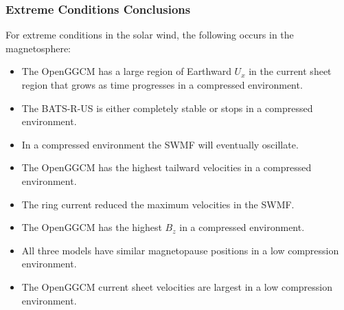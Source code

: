 \begin{frame}[shrink]
\frametitle{Extreme Conditions Conclusions}
For extreme conditions in the solar wind, the
following occurs in the magnetosphere:
\begin{itemize}
  \item The OpenGGCM has a large region of Earthward $U_x$ in the current sheet
  region that grows as time progresses in a compressed environment.
  \item The BATS-R-US is either completely stable or stops in a compressed
  environment.
  \item In a compressed environment the SWMF will eventually oscillate.
  \item The OpenGGCM has the highest tailward velocities in a compressed
  environment.
  \item The ring current reduced the maximum velocities in the SWMF.
  \item The OpenGGCM has the highest $B_z$ in a compressed environment.
  \item All three models have similar magnetopause positions in a low
  compression environment.
  \item The OpenGGCM current sheet velocities are largest in a low compression
  environment.
\end{itemize}
\end{frame}

